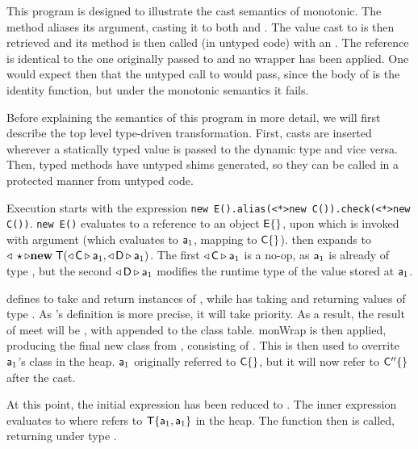 \documentclass[sigconf]{acmart}
\newcommand{\code}[1]{{\tt #1}\xspace}
\begin{document}
This program is designed to illustrate the cast semantics of monotonic. The
method  aliases its argument, casting it to both \C and \D. The
value cast to \C is then retrieved and its method  is then called
(in untyped code) with an . The reference is identical to the one
originally passed to  and no wrapper has been applied. One would
expect then that the untyped call to  would pass, since the body
of  is the identity function, but under the monotonic semantics it
fails.

Before explaining the semantics of this program in more detail, we will first
describe the top level type-driven transformation. First, casts are inserted
wherever a statically typed value is passed to the dynamic type \any and vice versa. Then, typed
methods have untyped shims generated, so they can be called in a protected
manner from untyped code. 

Execution starts with the expression \code{new E().alias(<*>new
C()).check(<*>new C())}. \code{new E()} evaluates to a reference \a to an
object ${\sf{E}}\{\}$, upon which  is invoked with argument \New\C{}
(which evaluates to $\a[1]$, mapping to $\C\{\}$).  then expands to
$\MonCast\any{\New{\xt{T}}{\MonCast\C{\a[1]},\MonCast\D{\a[1]}}}$. The first
$\MonCast\C{\a[1]}$ is a no-op, as ${\a[1]}$ is already of type \C, but the second
$\MonCast\D{\a[1]}$ modifies the runtime type of the value stored at ${\a[1]}$.

\D defines  to take and return instances of , while \C  has
 taking and returning values of type \any. As \D's definition is
more precise, it will take priority. As a result, the result of meet will be
\Cp, with \Class{} appended to the
class table. monWrap is then applied, producing the final new class \Cpp from
\Cp, consisting of \Class{}. This is then used to overrite ${\a[1]}$'s class in the heap. ${\a[1]}$ originally
referred to $\C\{\}$, but it will now refer to ${\sf{C''}}\{\}$ after the cast.

At this point, the initial expression has been reduced to
. The inner expression
\any\any evaluates to
\any\any where \a[2] refers to $\xt{T}\{{\a[1]},{\a[1]}\}$
in the heap. The  function then is called, returning {\a[1]} under type
\any.
\end{document}
